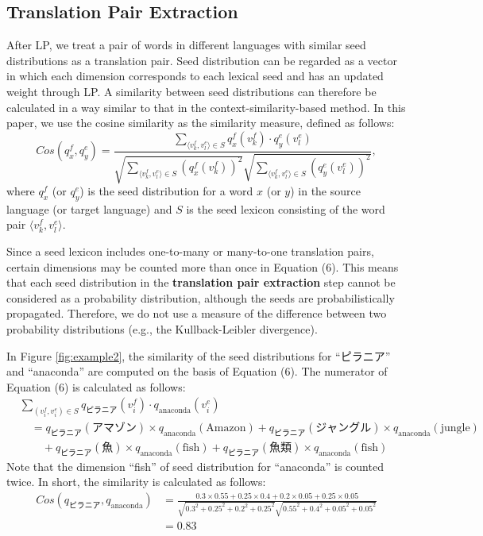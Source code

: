 \documentclass[english]{jnlp_1.4}
\begin{document}
\subsection{Translation Pair Extraction}
\label{sect:identify}

After LP, we treat a pair of words in different languages with similar seed distributions as a translation pair. 
Seed distribution can be regarded as a vector in which each dimension corresponds to each lexical seed and has an updated weight through LP. 
A similarity between seed distributions can therefore be calculated in a way similar to that in the context-similarity-based method. 
In this paper, we use the cosine similarity as the similarity measure, defined as follows: 
\begin{equation}
 \mathit{Cos}(q_{x}^{f}, q_{y}^{e}) = \frac{\sum_{\langle v_{k}^{f}, v_{l}^{e} \rangle \in S} {q_{x}^{f}(v_{k}^{f}) \cdot q_{y}^{e}(v_{l}^{e})}}{\sqrt{\sum_{\langle v_{k}^{f}, v_{l}^{e} \rangle \in S} (q_{x}^{f}(v_{k}^{f}))^{2}} \sqrt{\sum_{\langle v_{k}^{f}, v_{l}^{e} \rangle \in S} (q_{y}^{e}(v_{l}^{e}))^{2}}}, 
\end{equation}
where $q_{x}^{f}$ (or $q_{y}^{e}$) is the seed distribution for a word $x$ (or $y$) in the source language (or target language) and $S$ is the seed lexicon consisting of the word pair $\langle v_{k}^{f}, v_{l}^{e} \rangle$. 

Since a seed lexicon includes one-to-many or many-to-one translation pairs, certain dimensions may be counted more than once in Equation (6). 
This means that each seed distribution in the {\bf translation pair extraction} step cannot be considered as a probability distribution, although the seeds are probabilistically propagated. 
Therefore, we do not use a measure of the difference between two probability distributions (e.g., the Kullback-Leibler divergence). 

In Figure \ref{fig:example2}, the similarity of the seed distributions for ``ピラニア'' and ``anaconda'' are computed on the basis of Equation (6). 
The numerator of Equation (6) is calculated as follows: 
\[
\begin{split}
 & \sum_{(v_{i}^{f}, v_{i}^{e}) \in S} {q_{ピラニア}(v_{i}^{f}) \cdot q_\mathrm{anaconda}(v_{i}^{e})} \\
 & \quad = q_{ピラニア}(アマゾン) \times q_\mathrm{anaconda}(\mathrm{Amazon}) + q_{ピラニア}(ジャングル) \times q_\mathrm{anaconda}(\mathrm{jungle}) \\
 & \qquad + q_{ピラニア}(魚) \times q_\mathrm{anaconda}(\mathrm{fish}) + q_{ピラニア}(魚類) \times q_\mathrm{anaconda}(\mathrm{fish})
\end{split}
\]
Note that the dimension ``fish'' of seed distribution for ``anaconda'' is counted twice. 
In short, the similarity is calculated as follows: 
\begin{align*}
 \mathit{Cos}(q_{ピラニア}, q_\mathrm{anaconda}) & =  \frac{0.3\times0.55 + 0.25\times0.4+ 0.2\times0.05+ 0.25\times 0.05}{\sqrt{0.3^2+0.25^2+0.2^2+0.25^2}\sqrt{0.55^2+0.4^2+0.05^2+0.05^2}} \\
 & = 0.83
\end{align*}
\end{document}
